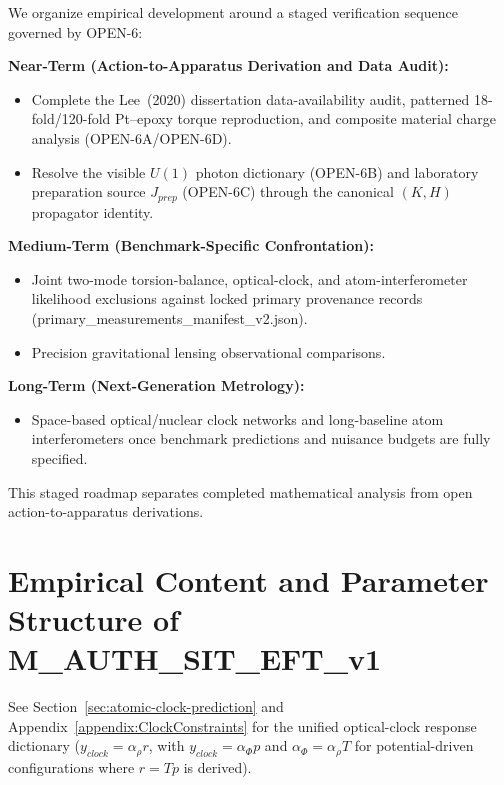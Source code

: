 \documentclass[american,11pt,letterpaper]{article}
\def\mathcal#1{#1}%
\def\mathrm#1{#1}%
\def\texttt#1{#1}%
\begin{document}
We organize empirical development around a staged verification sequence governed by \texttt{OPEN-6}:

\textbf{Near-Term (Action-to-Apparatus Derivation and Data Audit):}
\begin{itemize}
    \item Complete the Lee~(2020) dissertation data-availability audit, patterned 18-fold/120-fold Pt--epoxy torque reproduction, and composite material charge analysis (\texttt{OPEN-6A}/\texttt{OPEN-6D}).
    \item Resolve the visible $U(1)$ photon dictionary (\texttt{OPEN-6B}) and laboratory preparation source $J_{\mathrm{prep}}$ (\texttt{OPEN-6C}) through the canonical $(K, H)$ propagator identity.
\end{itemize}

\textbf{Medium-Term (Benchmark-Specific Confrontation):}
\begin{itemize}
    \item Joint two-mode torsion-balance, optical-clock, and atom-interferometer likelihood exclusions against locked primary provenance records (\texttt{primary\_measurements\_manifest\_v2.json}).
    \item Precision gravitational lensing observational comparisons.
\end{itemize}

\textbf{Long-Term (Next-Generation Metrology):}
\begin{itemize}
    \item Space-based optical/nuclear clock networks and long-baseline atom interferometers once benchmark predictions and nuisance budgets are fully specified.
\end{itemize}

This staged roadmap separates completed mathematical analysis from open action-to-apparatus derivations.

\section{Empirical Content and Parameter Structure of \texttt{M\_AUTH\_SIT\_EFT\_v1}}
\label{sec:empirical-content}
See Section~\ref{sec:atomic-clock-prediction} and Appendix~\ref{appendix:ClockConstraints} for the unified optical-clock response dictionary ($y_{\mathrm{clock}} = \alpha_\rho r$, with $y_{\mathrm{clock}} = \alpha_\Phi p$ and $\alpha_\Phi = \alpha_\rho\mathcal{T}$ for potential-driven configurations where $r = \mathcal{T} p$ is derived).
\end{document}
